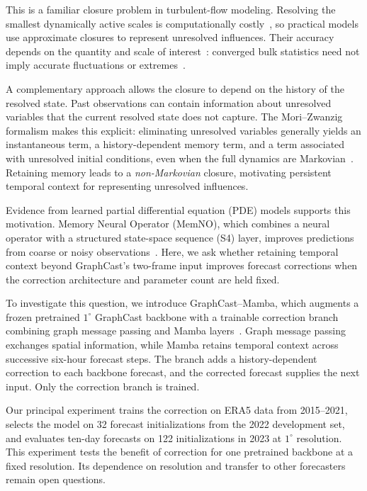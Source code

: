 \documentclass{article}
\newcommand{\vfourchange}[1]{{\color{blue}#1}}
\begin{document}
{This is a familiar closure problem in turbulent-flow modeling. Resolving the smallest dynamically active scales is computationally costly~\citep{yang2021grid}, so practical models use approximate closures to represent unresolved influences. Their accuracy depends on the quantity and scale of interest~\citep{pietarila2013closures}: converged bulk statistics need not imply accurate fluctuations or extremes~\citep{DonzisResolutionEffects}.}

{A complementary approach allows the closure to depend on the history of the resolved state. Past observations can contain information about unresolved variables that the current resolved state does not capture. The Mori--Zwanzig formalism makes this explicit: eliminating unresolved variables generally yields an instantaneous term, a history-dependent memory term, and a term associated with unresolved initial conditions, even when the full dynamics are Markovian~\citep{YenTingLinMZ2021,de2026data}. Retaining memory leads to a \emph{non-Markovian} closure, motivating persistent temporal context for representing unresolved influences.}

{Evidence from learned partial differential equation (PDE) models supports this motivation. Memory Neural Operator (MemNO), which combines a neural operator with a structured state-space sequence (S4) layer, improves predictions from coarse or noisy observations~\citep{buitrago2025memory}. Here, we ask whether retaining temporal context beyond GraphCast's two-frame input improves forecast corrections when the correction architecture and parameter count are held fixed.}


{To investigate this question, we introduce GraphCast--Mamba, which augments a frozen pretrained $1^\circ$ GraphCast backbone with a trainable correction branch combining graph message passing and Mamba layers~\citep{lam2023graphcast,gu2023mamba}. Graph message passing exchanges spatial information, while Mamba retains temporal context across successive six-hour forecast steps. The branch adds a history-dependent correction to each backbone forecast, and the corrected forecast supplies the next input. Only the correction branch is trained.}

Our principal experiment trains the correction on ERA5 data from 2015--2021\vfourchange{, selects the model on 32 forecast initializations from the 2022 development set,} and evaluates ten-day forecasts on \vfourchange{122 initializations in 2023} at $1^\circ$ resolution. This experiment tests the benefit of correction for one pretrained backbone at a fixed resolution. Its dependence on resolution and transfer to other forecasters remain open questions.
\end{document}
